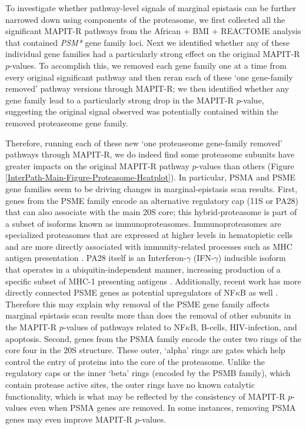 \documentclass[12pt,a4paper]{article}
\begin{document}
To investigate whether pathway-level signals of marginal epistasis can be further narrowed down using components of the proteasome, we first collected all the significant MAPIT-R pathways from the African + BMI + REACTOME analysis that contained \emph{PSM*} gene family loci. Next we identified whether any of these individual gene families had a particularly strong effect on the original MAPIT-R $p$-values. To accomplish this, we removed each gene family one at a time from every original significant pathway and then reran each of these `one gene-family removed' pathway versions through MAPIT-R; we then identified whether any gene family lead to a particularly strong drop in the MAPIT-R $p$-value, suggesting the original signal observed was potentially contained within the removed proteaseome gene family.  

Therefore, running each of these new `one proteaseome gene-family removed' pathways through MAPIT-R, we do indeed find some proteasome subunits have greater impacts on the original MAPIT-R pathway $p$-values than others (Figure \ref{InterPath-Main-Figure-Proteasome-Heatplot}). In particular, PSMA and PSME gene families seem to be driving changes in marginal-epistasis scan results. First, genes from the PSME family encode an alternative regulatory cap (11S or PA28) that can also associate with the main 20S core; this hybrid-proteasome is part of a subset of isoforms known as immunoproteasomes. Immunoproteasomes are specialized proteasomes that are expressed at higher levels in hematopietic cells and are more directly associated with immunity-related processes such as MHC antigen presentation \citep{Ferrington2012,Basler2013,McCarthy2015}. PA28 itself is an Interferon-$\gamma$ (IFN-$\gamma$) inducible isoform that operates in a ubiquitin-independent manner, increasing production of a specific subset of MHC-1 presenting antigens \citep{Groettrup1996,de2011,Raule2014,Murata2018}. Additionally, recent work has more directly connected PSME genes as potential upregulators of NF$\kappa$B as well \citep{Sun2016,Mitchell2019}. Therefore this may explain why removal of the PSME gene family affects marginal epistasis scan results more than does the removal of other subunits in the MAPIT-R $p$-values of pathways related to NF$\kappa$B, B-cells, HIV-infection, and apoptosis. Second, genes from the PSMA family encode the outer two rings of the core four in the 20S structure. These outer, `alpha' rings are gates which help control the entry of proteins into the core of the proteasome. Unlike the regulatory caps or the inner `beta' rings (encoded by the PSMB family), which contain protease active sites, the outer rings have no known catalytic functionality, which is what may be reflected by the consistency of MAPIT-R $p$-values even when PSMA genes are removed. In some instances, removing PSMA genes may even improve MAPIT-R $p$-values.
\end{document}
